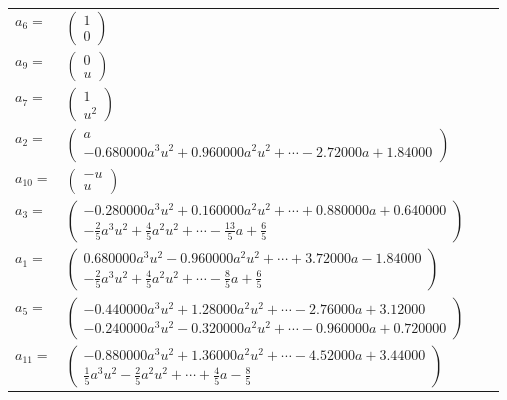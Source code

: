 \documentclass[1p]{elsarticle_modified}
\theoremstyle{definition}
\begin{document}
\begin{tabular}{m{7pt} m{180pt} m{7pt} m{180pt} }
\flushright $a_{6}=$&$\begin{pmatrix}1\\0\end{pmatrix}$ \\
\flushright $a_{9}=$&$\begin{pmatrix}0\\u\end{pmatrix}$ \\
\flushright $a_{7}=$&$\begin{pmatrix}1\\u^2\end{pmatrix}$ \\
\flushright $a_{2}=$&$\begin{pmatrix}a\\-0.680000 a^{3} u^{2}+0.960000 a^{2} u^{2}+\cdots-2.72000 a+1.84000\end{pmatrix}$ \\
\flushright $a_{10}=$&$\begin{pmatrix}- u\\u\end{pmatrix}$ \\
\flushright $a_{3}=$&$\begin{pmatrix}-0.280000 a^{3} u^{2}+0.160000 a^{2} u^{2}+\cdots+0.880000 a+0.640000\\-\frac{2}{5} a^3 u^2+\frac{4}{5} a^2 u^2+\cdots-\frac{13}{5} a+\frac{6}{5}\end{pmatrix}$ \\
\flushright $a_{1}=$&$\begin{pmatrix}0.680000 a^{3} u^{2}-0.960000 a^{2} u^{2}+\cdots+3.72000 a-1.84000\\-\frac{2}{5} a^3 u^2+\frac{4}{5} a^2 u^2+\cdots-\frac{8}{5} a+\frac{6}{5}\end{pmatrix}$ \\
\flushright $a_{5}=$&$\begin{pmatrix}-0.440000 a^{3} u^{2}+1.28000 a^{2} u^{2}+\cdots-2.76000 a+3.12000\\-0.240000 a^{3} u^{2}-0.320000 a^{2} u^{2}+\cdots-0.960000 a+0.720000\end{pmatrix}$ \\
\flushright $a_{11}=$&$\begin{pmatrix}-0.880000 a^{3} u^{2}+1.36000 a^{2} u^{2}+\cdots-4.52000 a+3.44000\\\frac{1}{5} a^3 u^2-\frac{2}{5} a^2 u^2+\cdots+\frac{4}{5} a-\frac{8}{5}\end{pmatrix}$ \\

\end{tabular}
\end{document}
